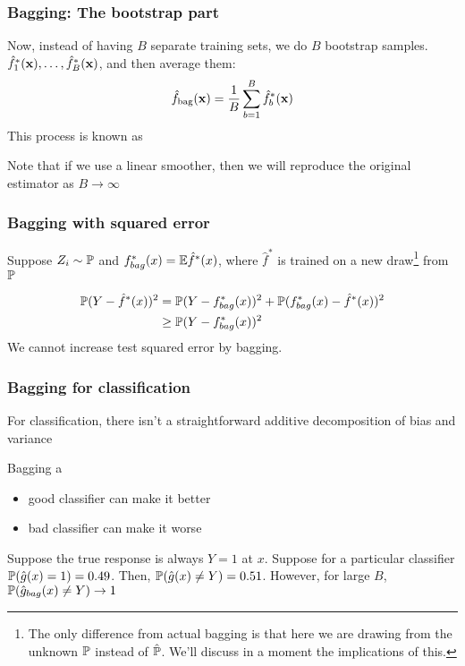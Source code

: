 \documentclass[12pt]{beamer}
\begin{document}
\begin{frame}
             \begin{center} 
        \end{center}
\end{frame}

\begin{frame}[fragile]
\frametitle{Bagging: The bootstrap part}
Now, instead of having $B$ separate training sets, we do $B$ bootstrap samples.
$\hat f_1^{*}(\x), \ldots, \hat f_B^{*}(\x)$, and then average them:
\[
\hat f_{\textrm{bag}}(\x) = \frac{1}{B} \sum_{b=1}^B \hat f_b^{*}(\x)
\]
This process is known as 

\vsp
Note that if we use a linear smoother, then we will reproduce the original estimator as $B \rightarrow \infty$
\end{frame}


\begin{frame}[fragile]
\frametitle{Bagging with squared error}
Suppose $Z_i \sim \P$ and $f_{bag}^*(x) = \E \hat{f}^*(x)$, where $\hat{f}^*$ is trained on a new draw\footnote{The 
only difference from actual bagging  is that here we are drawing from the unknown $\P$ instead of $\hat{\P}$.  We'll discuss in a moment
the implications of this.}
from $\P$



\begin{align*}
\P(Y -  \hat{f}^*(x))^2 
& = 
\P(Y - f_{bag}^*(x))^2 + \P(f_{bag}^*(x) - \hat{f}^*(x))^2 \\
& \geq
\P(Y - f_{bag}^*(x))^2
\end{align*}
 We cannot increase test squared error by bagging.  
\end{frame}

\begin{frame}[fragile]
\frametitle{Bagging for classification}
For classification, there isn't a straightforward additive decomposition of bias and variance

\vsp
Bagging a 
\begin{itemize}
\item good classifier can make it better
\item bad classifier can make it worse
\end{itemize}
\vsp

 Suppose the true response is always $Y = 1$ at $x$. Suppose for a
particular classifier $\P(\hat{g}(x) = 1) = 0.49$.  Then, $\P(\hat{g}(x) \neq Y) = 0.51$.  However,
for large $B$,  $\P(\hat{g}_{bag}(x) \neq Y) \rightarrow 1$
\end{frame}
\end{document}
